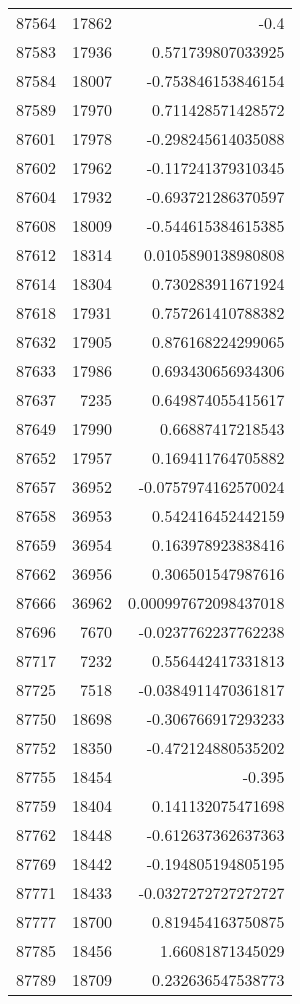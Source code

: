 \begin{tabular}{r | r | r}
87564 & 17862 & -0.4 \\
87583 & 17936 & 0.571739807033925 \\
87584 & 18007 & -0.753846153846154 \\
87589 & 17970 & 0.711428571428572 \\
87601 & 17978 & -0.298245614035088 \\
87602 & 17962 & -0.117241379310345 \\
87604 & 17932 & -0.693721286370597 \\
87608 & 18009 & -0.544615384615385 \\
87612 & 18314 & 0.0105890138980808 \\
87614 & 18304 & 0.730283911671924 \\
87618 & 17931 & 0.757261410788382 \\
87632 & 17905 & 0.876168224299065 \\
87633 & 17986 & 0.693430656934306 \\
87637 & 7235 & 0.649874055415617 \\
87649 & 17990 & 0.66887417218543 \\
87652 & 17957 & 0.169411764705882 \\
87657 & 36952 & -0.0757974162570024 \\
87658 & 36953 & 0.542416452442159 \\
87659 & 36954 & 0.163978923838416 \\
87662 & 36956 & 0.306501547987616 \\
87666 & 36962 & 0.000997672098437018 \\
87696 & 7670 & -0.0237762237762238 \\
87717 & 7232 & 0.556442417331813 \\
87725 & 7518 & -0.0384911470361817 \\
87750 & 18698 & -0.306766917293233 \\
87752 & 18350 & -0.472124880535202 \\
87755 & 18454 & -0.395 \\
87759 & 18404 & 0.141132075471698 \\
87762 & 18448 & -0.612637362637363 \\
87769 & 18442 & -0.194805194805195 \\
87771 & 18433 & -0.0327272727272727 \\
87777 & 18700 & 0.819454163750875 \\
87785 & 18456 & 1.66081871345029 \\
87789 & 18709 & 0.232636547538773 \\

\end{tabular}
